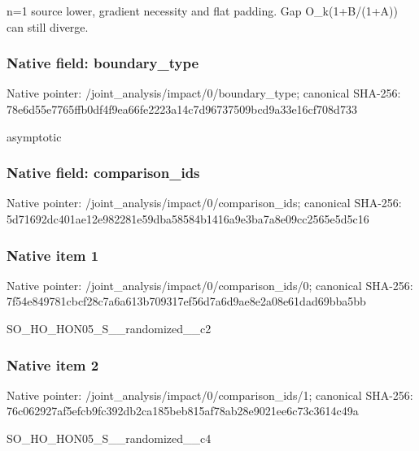 \documentclass[10pt,a4paper]{article}
\begin{document}
\begingroup\raggedright\sloppy n=\allowbreak{}1 source lower,\allowbreak{} gradient necessity and flat padding. Gap O\_\allowbreak{}k(1+B/\allowbreak{}(1+A)) can still diverge.\par\endgroup

\subsubsection{Native field: boundary\_\allowbreak{}type}
Native pointer: /joint\_\allowbreak{}analysis/impact/0/boundary\_\allowbreak{}type; canonical SHA-256: 78e6d55e7765ffb0df4f9ea66fe2223a14c7d96737509bcd9a33e16cf708d733

\begingroup\raggedright\sloppy asymptotic\par\endgroup

\subsubsection{Native field: comparison\_\allowbreak{}ids}
Native pointer: /joint\_\allowbreak{}analysis/impact/0/comparison\_\allowbreak{}ids; canonical SHA-256: 5d71692dc401ae12e982281e59dba58584b1416a9e3ba7a8e09cc2565e5d5c16

\subsubsection{Native item 1}
Native pointer: /joint\_\allowbreak{}analysis/impact/0/comparison\_\allowbreak{}ids/0; canonical SHA-256: 7f54e849781cbcf28c7a6a613b709317ef56d7a6d9ae8e2a08e61dad69bba5bb

\begingroup\raggedright\sloppy SO\_\allowbreak{}HO\_\allowbreak{}HON05\_\allowbreak{}S\_\allowbreak{}\_\allowbreak{}randomized\_\allowbreak{}\_\allowbreak{}c2\par\endgroup

\subsubsection{Native item 2}
Native pointer: /joint\_\allowbreak{}analysis/impact/0/comparison\_\allowbreak{}ids/1; canonical SHA-256: 76c062927af5efcb9fc392db2ca185beb815af78ab28e9021ee6c73c3614c49a

\begingroup\raggedright\sloppy SO\_\allowbreak{}HO\_\allowbreak{}HON05\_\allowbreak{}S\_\allowbreak{}\_\allowbreak{}randomized\_\allowbreak{}\_\allowbreak{}c4\par\endgroup
\end{document}
